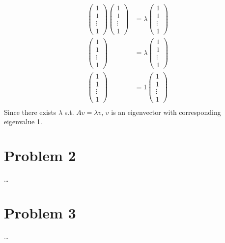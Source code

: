 \documentclass[fleqn]{article}
\begin{document}
\begin{equation*}
    \begin{split}
        \begin{pmatrix}1\\1\\ \vdots\\1\end{pmatrix}\begin{pmatrix}1\\1\\ \vdots\\1\end{pmatrix}&=\lambda \begin{pmatrix}1\\1\\ \vdots\\1\end{pmatrix}\\
        \begin{pmatrix}1\\1\\ \vdots\\1\end{pmatrix}&=\lambda \begin{pmatrix}1\\1\\ \vdots\\1\end{pmatrix}\\
        \begin{pmatrix}1\\1\\ \vdots\\1\end{pmatrix}&=1 \begin{pmatrix}1\\1\\ \vdots\\1\end{pmatrix}\\
    \end{split}
\end{equation*}
Since there exists $\lambda$ s.t. $Av=\lambda v$, $v$ is an eigenvector with corresponding eigenvalue 1.
\section*{Problem 2}
\dots %
\section*{Problem 3}
\dots %
\end{document}
